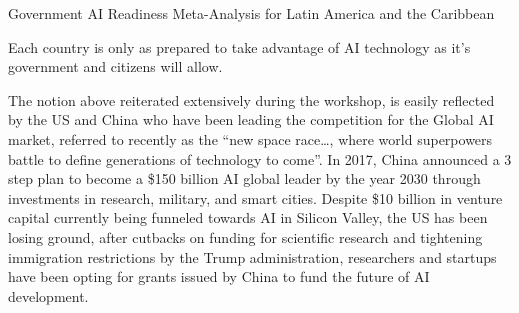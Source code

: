 \documentclass[journal]{IEEEtran}
\begin{document}
Government AI Readiness Meta-Analysis for Latin America and the Caribbean

Each country is only as prepared to take advantage of AI technology as it’s government and citizens will allow.

The notion above reiterated extensively during the workshop, is easily reflected by the US and China who have been leading the competition for the Global AI market, referred to recently as the “new space race…, where world superpowers battle to define generations of technology to come”. In 2017, China announced a 3 step plan to become a \$150 billion AI global leader by the year 2030 through investments in research, military, and smart cities. Despite \$10 billion in venture capital currently being funneled towards AI in Silicon Valley, the US has been losing ground, after cutbacks on funding for scientific research and tightening immigration restrictions by the Trump administration, researchers and startups have been opting for grants issued by China to fund the future of AI development.
\end{document}
